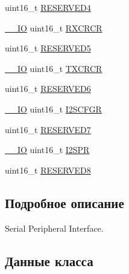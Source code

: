 \begin{DoxyCompactItemize}
\item 
uint16\+\_\+t \mbox{\hyperlink{struct_s_p_i___type_def_a20e3ac1445ed1e7a9792ca492c46a73a}{R\+E\+S\+E\+R\+V\+E\+D4}}
\item 
\mbox{\hyperlink{group___c_m_s_i_s___c_m3__core__definitions_gaec43007d9998a0a0e01faede4133d6be}{\+\_\+\+\_\+\+IO}} uint16\+\_\+t \mbox{\hyperlink{struct_s_p_i___type_def_ab53da6fb851d911ae0b1166be2cfe48a}{R\+X\+C\+R\+CR}}
\item 
uint16\+\_\+t \mbox{\hyperlink{struct_s_p_i___type_def_ab63440e38c7872a8ed11fb2d8d94714e}{R\+E\+S\+E\+R\+V\+E\+D5}}
\item 
\mbox{\hyperlink{group___c_m_s_i_s___c_m3__core__definitions_gaec43007d9998a0a0e01faede4133d6be}{\+\_\+\+\_\+\+IO}} uint16\+\_\+t \mbox{\hyperlink{struct_s_p_i___type_def_a3c0c1be66bc0a1846274a7511f4a36f5}{T\+X\+C\+R\+CR}}
\item 
uint16\+\_\+t \mbox{\hyperlink{struct_s_p_i___type_def_a0870177921541602a44f744f1b66e823}{R\+E\+S\+E\+R\+V\+E\+D6}}
\item 
\mbox{\hyperlink{group___c_m_s_i_s___c_m3__core__definitions_gaec43007d9998a0a0e01faede4133d6be}{\+\_\+\+\_\+\+IO}} uint16\+\_\+t \mbox{\hyperlink{struct_s_p_i___type_def_a20a4775ce461eec0d9a437bed464c0a5}{I2\+S\+C\+F\+GR}}
\item 
uint16\+\_\+t \mbox{\hyperlink{struct_s_p_i___type_def_a98df0a538eb077b2cfc5194eda200f1b}{R\+E\+S\+E\+R\+V\+E\+D7}}
\item 
\mbox{\hyperlink{group___c_m_s_i_s___c_m3__core__definitions_gaec43007d9998a0a0e01faede4133d6be}{\+\_\+\+\_\+\+IO}} uint16\+\_\+t \mbox{\hyperlink{struct_s_p_i___type_def_aecee11b0d2e534b5243e9db6a0e10026}{I2\+S\+PR}}
\item 
uint16\+\_\+t \mbox{\hyperlink{struct_s_p_i___type_def_a0ffe762827b71caff20c75bf105387f6}{R\+E\+S\+E\+R\+V\+E\+D8}}
\end{DoxyCompactItemize}


\subsection{Подробное описание}
Serial Peripheral Interface. 

\subsection{Данные класса}
\mbox{\label{struct_s_p_i___type_def_a1e398155ddd013fcdd41309b4bd0bd5f}} 
